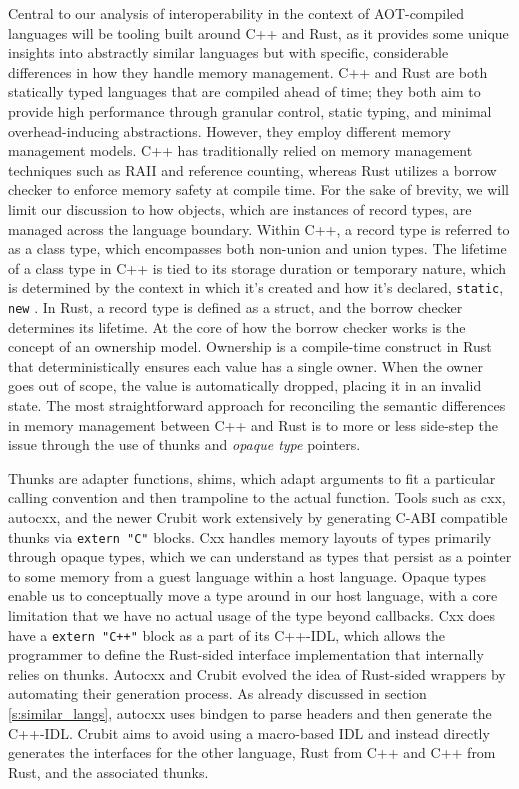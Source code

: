 Central to our analysis of interoperability in the context of AOT-compiled languages will be tooling built around C++ and Rust, as it provides some unique insights into abstractly similar languages but with specific, considerable differences in how they handle memory management. C++ and Rust are both statically typed languages that are compiled ahead of time; they both aim to provide high performance through granular control, static typing, and minimal overhead-inducing abstractions. However, they employ different memory management models. C++ has traditionally relied on memory management techniques such as RAII and reference counting, whereas Rust utilizes a borrow checker to enforce memory safety at compile time. For the sake of brevity, we will limit our discussion to how objects, which are instances of record types, are managed across the language boundary. Within C++, a record type is referred to as a class type, which encompasses both non-union and union types. The lifetime of a class type in C++ is tied to its storage duration or temporary nature, which is determined by the context in which it's created and how it's declared, \ie \texttt{static}, \texttt{new} \cite{cppreference_class}. In Rust, a record type is defined as a struct, and the borrow checker determines its lifetime. At the core of how the borrow checker works is the concept of an ownership model. Ownership is a compile-time construct in Rust that deterministically ensures each value has a single owner. When the owner goes out of scope, the value is automatically dropped, placing it in an invalid state. The most straightforward approach for reconciling the semantic differences in memory management between C++ and Rust is to more or less side-step the issue through the use of thunks and \textit{opaque type} pointers. 

Thunks are adapter functions, \ie shims, which adapt arguments to fit a particular calling convention and then trampoline to the actual function. Tools such as cxx, autocxx, and the newer Crubit \cite{crubit} work extensively by generating C-ABI compatible thunks via \texttt{extern "C"} blocks. Cxx handles memory layouts of types primarily through opaque types, which we can understand as types that persist as a pointer to some memory from a guest language within a host language. Opaque types enable us to conceptually move a type around in our host language, with a core limitation that we have no actual usage of the type beyond callbacks. Cxx does have a \texttt{extern "C++"} block as a part of its C++-IDL, which allows the programmer to define the Rust-sided interface implementation that internally relies on thunks. Autocxx and Crubit evolved the idea of Rust-sided wrappers by automating their generation process. As already discussed in section \ref{s:similar_langs}, autocxx uses bindgen to parse headers and then generate the C++-IDL. Crubit aims to avoid using a macro-based IDL and instead directly generates the interfaces for the other language, \ie Rust from C++ and C++ from Rust, and the associated thunks. 

